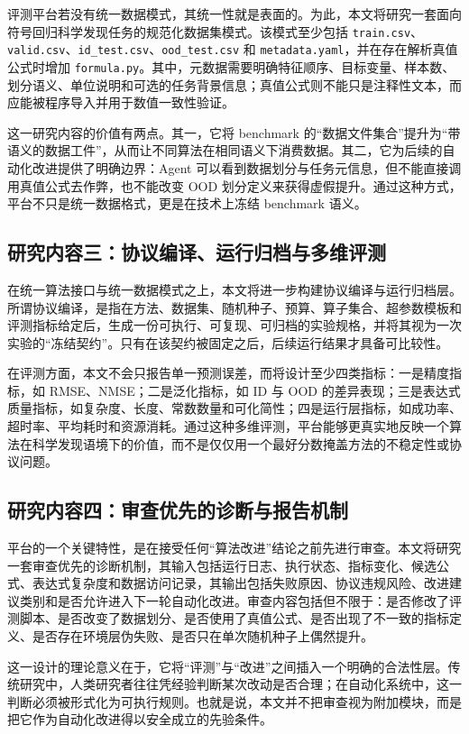 \documentclass[UTF8,12pt]{ctexart}
\begin{document}
评测平台若没有统一数据模式，其统一性就是表面的。为此，本文将研究一套面向符号回归科学发现任务的规范化数据集模式。该模式至少包括 \texttt{train.csv}、\texttt{valid.csv}、\texttt{id\_test.csv}、\texttt{ood\_test.csv} 和 \texttt{metadata.yaml}，并在存在解析真值公式时增加 \texttt{formula.py}。其中，元数据需要明确特征顺序、目标变量、样本数、划分语义、单位说明和可选的任务背景信息；真值公式则不能只是注释性文本，而应能被程序导入并用于数值一致性验证。

这一研究内容的价值有两点。其一，它将 benchmark 的“数据文件集合”提升为“带语义的数据工件”，从而让不同算法在相同语义下消费数据。其二，它为后续的自动化改进提供了明确边界：Agent 可以看到数据划分与任务元信息，但不能直接调用真值公式去作弊，也不能改变 OOD 划分定义来获得虚假提升。通过这种方式，平台不只是统一数据格式，更是在技术上冻结 benchmark 语义。

\subsection{研究内容三：协议编译、运行归档与多维评测}

在统一算法接口与统一数据模式之上，本文将进一步构建协议编译与运行归档层。所谓协议编译，是指在方法、数据集、随机种子、预算、算子集合、超参数模板和评测指标给定后，生成一份可执行、可复现、可归档的实验规格，并将其视为一次实验的“冻结契约”。只有在该契约被固定之后，后续运行结果才具备可比较性。

在评测方面，本文不会只报告单一预测误差，而将设计至少四类指标：一是精度指标，如 RMSE、NMSE；二是泛化指标，如 ID 与 OOD 的差异表现；三是表达式质量指标，如复杂度、长度、常数数量和可化简性；四是运行层指标，如成功率、超时率、平均耗时和资源消耗。通过这种多维评测，平台能够更真实地反映一个算法在科学发现语境下的价值，而不是仅仅用一个最好分数掩盖方法的不稳定性或协议问题。

\subsection{研究内容四：审查优先的诊断与报告机制}

平台的一个关键特性，是在接受任何“算法改进”结论之前先进行审查。本文将研究一套审查优先的诊断机制，其输入包括运行日志、执行状态、指标变化、候选公式、表达式复杂度和数据访问记录，其输出包括失败原因、协议违规风险、改进建议类别和是否允许进入下一轮自动化改进。审查内容包括但不限于：是否修改了评测脚本、是否改变了数据划分、是否使用了真值公式、是否出现了不一致的指标定义、是否存在环境层伪失败、是否只在单次随机种子上偶然提升。

这一设计的理论意义在于，它将“评测”与“改进”之间插入一个明确的合法性层。传统研究中，人类研究者往往凭经验判断某次改动是否合理；在自动化系统中，这一判断必须被形式化为可执行规则。也就是说，本文并不把审查视为附加模块，而是把它作为自动化改进得以安全成立的先验条件。
\end{document}
